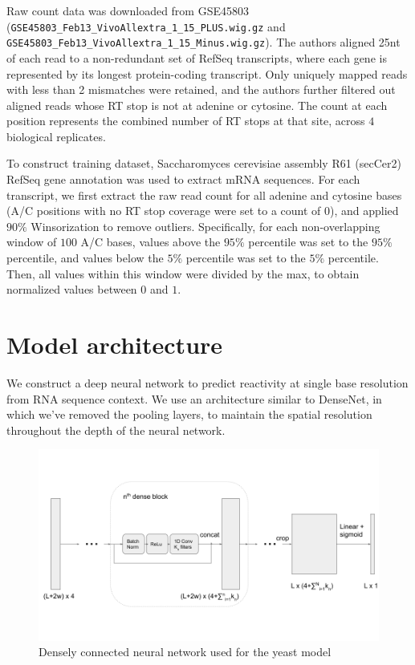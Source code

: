 \documentclass{proposal}
\begin{document}
Raw count data was downloaded from GSE45803 (\verb|GSE45803_Feb13_VivoAllextra_1_15_PLUS.wig.gz| and \verb|GSE45803_Feb13_VivoAllextra_1_15_Minus.wig.gz|).
The authors aligned 25nt of each read to a non-redundant set of RefSeq transcripts,
where each gene is represented by its longest protein-coding transcript.
Only uniquely mapped reads with less than 2 mismatches were retained,
and the authors further filtered out aligned reads whose RT stop is not at adenine or cytosine.
The count at each position represents the combined number of RT stops at that site, across $4$ biological replicates.

To construct training dataset, Saccharomyces cerevisiae assembly R61 (secCer2) RefSeq gene annotation was used to extract mRNA sequences.
For each transcript, we first extract the raw read count for all adenine and cytosine bases
(A/C positions with no RT stop coverage were set to a count of $0$),
and applied ﻿$90\%$ Winsorization to remove outliers.
Specifically, for each non-overlapping window of $100$ A/C bases, values above the $95\%$ percentile was set to the $95\%$ percentile,
and values below the $5\%$ percentile was set to the $5\%$ percentile.
Then, all values within this window were divided by the max, to obtain normalized values between $0$ and $1$.

\section{Model architecture}


We construct a deep neural network to predict reactivity at single base resolution from RNA sequence context.
We use an architecture similar to DenseNet\cite{huang2017densely},
in which we've removed the pooling layers, to maintain the spatial resolution throughout the depth of the neural network.


\begin{figure}
\includegraphics[width=\textwidth]{proposal_dense_net.png}
\caption{Densely connected neural network used for the yeast model}
\label{fig:dense_net}
\centering
\end{figure}
\end{document}
